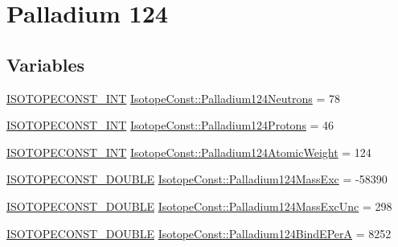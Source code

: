 \hypertarget{group___isotope_const-_palladium-_pd124}{}\section{Palladium 124}
\label{group___isotope_const-_palladium-_pd124}
\subsection*{Variables}
\begin{DoxyCompactItemize}
\item 
\mbox{\hyperlink{group___isotope_const-_macros_ga5f18360b3e99483a35c32d789e62621c}{I\+S\+O\+T\+O\+P\+E\+C\+O\+N\+S\+T\+\_\+\+I\+NT}} \mbox{\hyperlink{group___isotope_const-_palladium-_pd124_ga57e3466497323b29e417bb683325ae91}{Isotope\+Const\+::\+Palladium124\+Neutrons}} = 78
\item 
\mbox{\hyperlink{group___isotope_const-_macros_ga5f18360b3e99483a35c32d789e62621c}{I\+S\+O\+T\+O\+P\+E\+C\+O\+N\+S\+T\+\_\+\+I\+NT}} \mbox{\hyperlink{group___isotope_const-_palladium-_pd124_ga57a2ce0d043b70cee895ea0156d7587c}{Isotope\+Const\+::\+Palladium124\+Protons}} = 46
\item 
\mbox{\hyperlink{group___isotope_const-_macros_ga5f18360b3e99483a35c32d789e62621c}{I\+S\+O\+T\+O\+P\+E\+C\+O\+N\+S\+T\+\_\+\+I\+NT}} \mbox{\hyperlink{group___isotope_const-_palladium-_pd124_ga425ff12505418076b79d7ac0bdea3bd8}{Isotope\+Const\+::\+Palladium124\+Atomic\+Weight}} = 124
\item 
\mbox{\hyperlink{group___isotope_const-_macros_ga8f45a7272ce02c0b4c65c44636ed719a}{I\+S\+O\+T\+O\+P\+E\+C\+O\+N\+S\+T\+\_\+\+D\+O\+U\+B\+LE}} \mbox{\hyperlink{group___isotope_const-_palladium-_pd124_ga7290f746d6e1420efc0470afc3383f53}{Isotope\+Const\+::\+Palladium124\+Mass\+Exc}} = -\/58390
\item 
\mbox{\hyperlink{group___isotope_const-_macros_ga8f45a7272ce02c0b4c65c44636ed719a}{I\+S\+O\+T\+O\+P\+E\+C\+O\+N\+S\+T\+\_\+\+D\+O\+U\+B\+LE}} \mbox{\hyperlink{group___isotope_const-_palladium-_pd124_gac7f52b9bd4746f4c5191ee46a3535931}{Isotope\+Const\+::\+Palladium124\+Mass\+Exc\+Unc}} = 298
\item 
\mbox{\hyperlink{group___isotope_const-_macros_ga8f45a7272ce02c0b4c65c44636ed719a}{I\+S\+O\+T\+O\+P\+E\+C\+O\+N\+S\+T\+\_\+\+D\+O\+U\+B\+LE}} \mbox{\hyperlink{group___isotope_const-_palladium-_pd124_gaaf07ab6cd545e36f4c98d1ba1f4cf777}{Isotope\+Const\+::\+Palladium124\+Bind\+E\+PerA}} = 8252
\item 

\end{DoxyCompactItemize}
